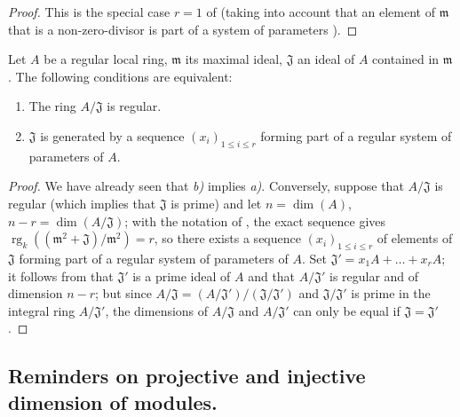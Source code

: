 \begin{proof}
This is the special case $r=1$ of  (taking into account that an element of $\mathfrak{m}$ that is a non-zero-divisor is part of a system of parameters ).
\end{proof}

\begin{corollary}[17.1.9]
\label{0.17.1.9}
Let $A$ be a regular local ring, $\mathfrak{m}$ its maximal ideal, $\mathfrak{J}$ an ideal of $A$ contained in $\mathfrak{m}$.
The following conditions are equivalent:
\begin{enumerate}
  \item[{\rm a)}] The ring $A/\mathfrak{J}$ is regular.
  \item[{\rm b)}] $\mathfrak{J}$ is generated by a sequence $(x_i)_{1\leq i\leq r}$ forming part of a regular system of parameters of $A$.
\end{enumerate}
\end{corollary}

\begin{proof}
We have already seen  that \emph{b)} implies \emph{a)}.
Conversely, suppose that $A/\mathfrak{J}$ is regular (which implies that $\mathfrak{J}$ is prime) and let $n=\dim(A)$, $n-r=\dim(A/\mathfrak{J})$;
with the notation of , the exact sequence  gives $\operatorname{rg}_k((\mathfrak{m}^2+\mathfrak{J})/\mathfrak{m}^2)=r$, so there exists a sequence $(x_i)_{1\leq i\leq r}$ of elements of $\mathfrak{J}$ forming part of a regular system of parameters of $A$.
Set $\mathfrak{J}'=x_1 A+\ldots+x_r A$;
it follows from  that $\mathfrak{J}'$ is a prime ideal of $A$ and that $A/\mathfrak{J}'$ is regular and of dimension $n-r$;
but since $A/\mathfrak{J}=(A/\mathfrak{J}')/(\mathfrak{J}/\mathfrak{J}')$ and $\mathfrak{J}/\mathfrak{J}'$ is prime in the integral ring $A/\mathfrak{J}'$, the dimensions of $A/\mathfrak{J}$ and $A/\mathfrak{J}'$ can only be equal if $\mathfrak{J}=\mathfrak{J}'$ .
\end{proof}

\subsection{Reminders on projective and injective dimension of modules.}
\label{subsection:0.17.2}

